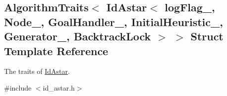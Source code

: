 \hypertarget{structAlgorithmTraits_3_01IdAstar_3_01logFlag___00_01Node___00_01GoalHandler___00_01InitialHeuri7dce81033cfaa9637ddb5741464809fc}{}\subsection{Algorithm\+Traits$<$ Id\+Astar$<$ log\+Flag\+\_\+, Node\+\_\+, Goal\+Handler\+\_\+, Initial\+Heuristic\+\_\+, Generator\+\_\+, Backtrack\+Lock $>$ $>$ Struct Template Reference}
\label{structAlgorithmTraits_3_01IdAstar_3_01logFlag___00_01Node___00_01GoalHandler___00_01InitialHeuri7dce81033cfaa9637ddb5741464809fc}


The traits of \hyperlink{structIdAstar}{Id\+Astar}.  




{\ttfamily \#include $<$id\+\_\+astar.\+h$>$}


